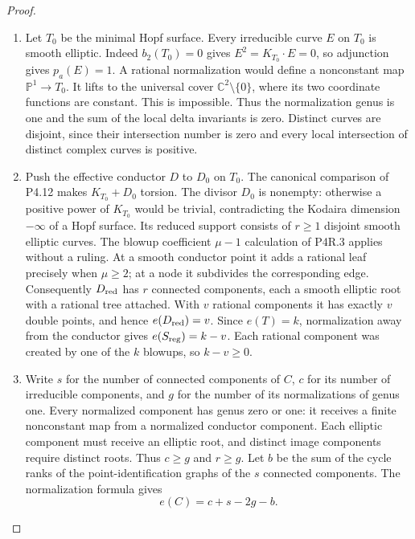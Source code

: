\begin{proof}

\begin{enumerate}[label={$\langle1\rangle$\arabic*.},leftmargin=*]
\item Let $T_0$ be the minimal Hopf surface. Every
irreducible curve $E$ on $T_0$ is smooth elliptic.
Indeed $b_2(T_0)=0$ gives $E^2=K_{T_0}\cdot E=0$,
so adjunction gives $p_a(E)=1$. A rational
normalization would define a nonconstant map
$\mathbb P^1\to T_0$. It lifts to the universal
cover $\mathbb C^2\setminus\{0\}$, where its two
coordinate functions are constant. This is
impossible. Thus the normalization genus is one
and the sum of the local delta invariants is zero.
Distinct curves are disjoint, since their
intersection number is zero and every local
intersection of distinct complex curves is
positive.

\item Push the effective conductor $D$ to $D_0$ on
$T_0$. The canonical comparison of P4.12 makes
$K_{T_0}+D_0$ torsion. The divisor $D_0$ is
nonempty: otherwise a positive power of $K_{T_0}$
would be trivial, contradicting the Kodaira
dimension $-\infty$ of a Hopf surface. Its
reduced support consists of $r\ge1$ disjoint
smooth elliptic curves. The blowup coefficient
$\mu-1$ calculation of P4R.3 applies without a
ruling. At a smooth conductor point it adds a
rational leaf precisely when $\mu\ge2$; at a
node it subdivides the corresponding edge.
Consequently $D_{\rm red}$ has $r$ connected
components, each a smooth elliptic root with a
rational tree attached. With $v$ rational
components it has exactly $v$ double points,
and hence $e(D_{\rm red})=v$. Since
$e(T)=k$, normalization away from the conductor
gives $e(S_{\rm reg})=k-v$. Each rational
component was created by one of the $k$ blowups,
so $k-v\ge0$.

\item Write $s$ for the number of connected components
of $C$, $c$ for its number of irreducible
components, and $g$ for the number of its
normalizations of genus one. Every normalized
component has genus zero or one: it receives a
finite nonconstant map from a normalized
conductor component. Each elliptic component
must receive an elliptic root, and distinct
image components require distinct roots.
Thus $c\ge g$ and $r\ge g$. Let $b$ be the sum
of the cycle ranks of the point-identification
graphs of the $s$ connected components. The
normalization formula gives
\[
 e(C)=c+s-2g-b.
\]


\end{enumerate}
\end{proof}

